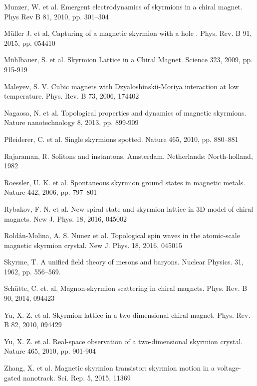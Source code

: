 \documentclass[a4paper,article,14pt]{extarticle}
\begin{document}
\begin{thebibliography}{1}
 Munzer, W. et al. \flqq Emergent electrodynamics of skyrmions in a chiral magnet\frqq. Phys Rev B 81, 2010, pp. 301–304

 Müller J. et al, \flqq Capturing of a magnetic skyrmion with a hole \flqq. Phys. Rev. B 91, 2015, pp. 054410

 Mühlbauer, S. et al. \flqq Skyrmion Lattice in a Chiral Magnet\frqq. Science 323, 2009, pp. 915-919

 Maleyev, S. V. \flqq Cubic magnets with Dzyaloshinskii-Moriya interaction at low temperature\frqq. Phys. Rev. B  73, 2006, 174402

 Nagaosa, N. et al. \flqq Topological properties and dynamics of magnetic skyrmions\frqq. Nature nanotechnology 8, 2013, pp. 899-909

 Pfleiderer, C. et al. \flqq Single skyrmions spotted\frqq. Nature 465, 2010, pp. 880–881

 Rajaraman, R. \flqq Solitons and instantons\frqq. Amsterdam, Netherlands: North-holland, 1982

 Roessler, U. K. et al. \flqq Spontaneous skyrmion ground
states in magnetic metals\frqq. Nature 442, 2006, pp. 797–801

 Rybakov, F. N. et al. \flqq New spiral state and skyrmion lattice in 3D model of chiral magnets\frqq. New J. Phys. 18, 2016, 045002

 Roldán-Molina, A. S. Nunez et al. \flqq Topological spin waves in the atomic-scale magnetic skyrmion crystal\frqq. New J. Phys. 18, 2016, 045015

 Skyrme, T. \flqq A unified field theory of mesons and baryons\frqq. Nuclear Physics. 31, 1962, pp. 556–569.

 Sch{\"u}tte, C. et. al. \flqq Magnon-skyrmion scattering in chiral magnets\frqq. Phys. Rev. B 90, 2014, 094423 

 Yu, X. Z. et al. \flqq Skyrmion lattice in a two-dimensional chiral magnet\frqq. Phys. Rev. B 82, 2010, 094429

 Yu, X. Z. et al. \flqq Real-space observation of a two-dimensional skyrmion crystal\frqq. Nature 465, 2010, pp. 901-904

 Zhang, X. et al. \flqq Magnetic skyrmion transistor: skyrmion motion in a voltage-gated nanotrack\frqq. Sci. Rep. 5, 2015, 11369

\end{thebibliography}
\end{document}
